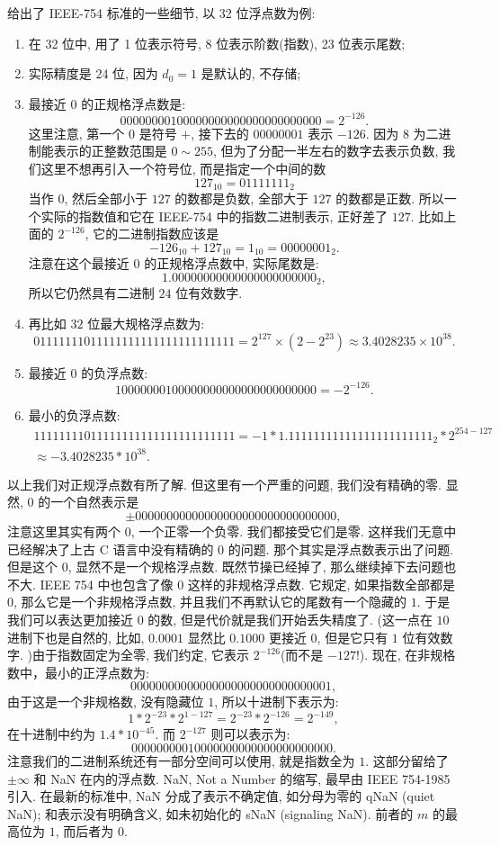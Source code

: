 \documentclass[a4paper]{ctexart}
\begin{document}
 给出了 IEEE-754 标准的一些细节, 以 32 位浮点数为例:
\begin{enumerate}
\item 在 32 位中, 用了 1 位表示符号, 8 位表示阶数(指数), 23 位表示尾数;
\item 实际精度是 24 位, 因为 $d_0 = 1$ 是默认的, 不存储;
\item 最接近 $0$ 的正规格浮点数是:
$$
0 00000001 00000000000000000000000 = 2^{-126}.
$$
这里注意, 第一个 $0$ 是符号 $+$, 接下去的 $00000001$ 表示 $-126$. 因为 $8$ 
为二进制能表示的正整数范围是 $0 \sim 255$, 但为了分配一半左右的数字去表示负数, 
我们这里不想再引入一个符号位, 而是指定一个中间的数 
$$
127_{10} = 01111111_{2}
$$
当作 $0$, 然后全部小于 $127$ 的数都是负数, 全部大于 $127$ 的数都是正数. 
所以一个实际的指数值和它在 IEEE-754 中的指数二进制表示, 正好差了 $127$. 
比如上面的 $2^{-126}$, 它的二进制指数应该是 
$$
-126_{10} + 127_{10} = 1_{10} = 00000001_{2}.
$$ 
注意在这个最接近 $0$ 的正规格浮点数中, 实际尾数是:
$$
1.00000000000000000000000_{2},
$$
所以它仍然具有二进制 $24$ 位有效数字.
\item 再比如 $32$ 位最大规格浮点数为:
$$
0 11111110 11111111111111111111111 = 2^{127} \times (2 - 2^{23}) \approx 
3.4028235 \times 10^{38}.
$$
\item 最接近 $0$ 的负浮点数:
$$
1 00000001 00000000000000000000000 = -2^{-126}.  
$$
\item 最小的负浮点数:
$$
\begin{array}{l}
1 11111110 11111111111111111111111 
= -1 * 1.11111111111111111111111_{2} * 2^{254-127} \\
\approx -3.4028235 * 10^{38}.
\end{array}
$$
\end{enumerate}
以上我们对正规浮点数有所了解. 但这里有一个严重的问题, 我们没有精确的零. 显然, $0$ 
的一个自然表示是
$$
\pm 0 00000000 00000000000000000000000,
$$
注意这里其实有两个 $0$, 一个正零一个负零. 我们都接受它们是零. 
这样我们无意中已经解决了上古 C 语言中没有精确的 $0$ 的问题. 那个其实是浮点数表示出了问题.
但是这个 $0$, 显然不是一个规格浮点数. 既然节操已经掉了, 那么继续掉下去问题也不大. 
IEEE 754 中也包含了像 $0$ 这样的非规格浮点数. 它规定, 如果指数全部都是 $0$, 
那么它是一个非规格浮点数, 并且我们不再默认它的尾数有一个隐藏的 $1$. 
于是我们可以表达更加接近 $0$ 的数, 但是代价就是我们开始丢失精度了. (这一点在 $10$ 
进制下也是自然的, 比如, $0.0001$ 显然比 $0.1000$ 更接近 $0$, 但是它只有 $1$ 
位有效数字. )由于指数固定为全零, 我们约定, 它表示 $2^{-126}$(而不是 $-127$!). 
现在, 在非规格数中，最小的正浮点数为:
$$
0 00000000 00000000000000000000001,
$$
由于这是一个非规格数, 没有隐藏位 $1$, 
所以十进制下表示为:
$$
1 * 2^{-23} * 2^{1-127} = 2^{-23} * 2^{-126} = 2^{-149},
$$
在十进制中约为 $1.4 * 10^{-45}$.
而 $2^{-127}$ 则可以表示为:
$$
0 00000000 10000000000000000000000.
$$ 
注意我们的二进制系统还有一部分空间可以使用, 就是指数全为 $1$.
这部分留给了$\pm \infty$ 和 NaN 在内的浮点数.
NaN, Not a Number 的缩写, 最早由 IEEE 754-1985 引入. 在最新的标准中,
NaN 分成了表示不确定值, 如分母为零的 qNaN (quiet NaN); 和表示没有明确含义,
如未初始化的 sNaN (signaling NaN). 前者的 $m$ 的最高位为 $1$,
而后者为 $0$.
\end{document}
